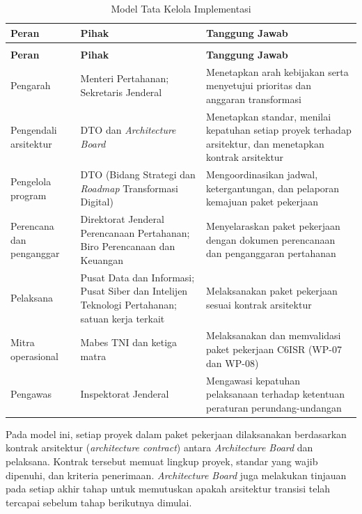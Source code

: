 \begin{longtable}{@{}>{\raggedright\arraybackslash}p{}>{\raggedright\arraybackslash}p{}>{\raggedright\arraybackslash}p{}@{}}
\caption{Model Tata Kelola Implementasi}
\label{tab:d4-43}\\
\toprule
\textbf{Peran} & \textbf{Pihak} & \textbf{Tanggung Jawab}\\
\midrule
\endfirsthead
\multicolumn{3}{@{}l}{\small\itshape \tablename\ \thetable{} (lanjutan)}\\
\toprule
\textbf{Peran} & \textbf{Pihak} & \textbf{Tanggung Jawab}\\
\midrule
\endhead
\bottomrule
\endlastfoot
Pengarah & Menteri Pertahanan; Sekretaris Jenderal & Menetapkan arah kebijakan serta menyetujui prioritas dan anggaran transformasi\\
Pengendali arsitektur & DTO dan \textit{Architecture Board} & Menetapkan standar, menilai kepatuhan setiap proyek terhadap arsitektur, dan menetapkan kontrak arsitektur\\
Pengelola program & DTO (Bidang Strategi dan \textit{Roadmap} Transformasi Digital) & Mengoordinasikan jadwal, ketergantungan, dan pelaporan kemajuan paket pekerjaan\\
Perencana dan penganggar & Direktorat Jenderal Perencanaan Pertahanan; Biro Perencanaan dan Keuangan & Menyelaraskan paket pekerjaan dengan dokumen perencanaan dan penganggaran pertahanan\\
Pelaksana & Pusat Data dan Informasi; Pusat Siber dan Intelijen Teknologi Pertahanan; satuan kerja terkait & Melaksanakan paket pekerjaan sesuai kontrak arsitektur\\
Mitra operasional & Mabes TNI dan ketiga matra & Melaksanakan dan memvalidasi paket pekerjaan C6ISR (WP-07 dan WP-08)\\
Pengawas & Inspektorat Jenderal & Mengawasi kepatuhan pelaksanaan terhadap ketentuan peraturan perundang-undangan\\
\end{longtable}

Pada model ini, setiap proyek dalam paket pekerjaan dilaksanakan berdasarkan kontrak arsitektur (\textit{architecture contract}) antara \textit{Architecture Board} dan pelaksana. Kontrak tersebut memuat lingkup proyek, standar yang wajib dipenuhi, dan kriteria penerimaan. \textit{Architecture Board} juga melakukan tinjauan pada setiap akhir tahap untuk memutuskan apakah arsitektur transisi telah tercapai sebelum tahap berikutnya dimulai.

